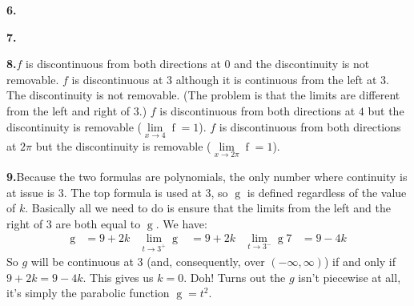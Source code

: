 \documentclass[12pt,]{book}
\theoremstyle{plain}
\theoremstyle{definition}
\numberwithin{equation}{section}
\newcommand{\fe}[2]{\mathop{{#1}{\left(#2\right)}}}
\newcommand{\ointerval}[2]{\left(#1,#2\right)}
\begin{document}
\par\smallskip
\noindent\textbf{6.}
\par\smallskip
\noindent\textbf{7.}
\par\smallskip
\noindent\textbf{8.}\quad{}\(f\) is discontinuous from both directions at \(0\) and the discontinuity is not removable. \(f\) is discontinuous at \(3\) although it is continuous from the left at \(3\).  The discontinuity is not removable.  (The problem is that the limits are different from the left and right of \(3\).) \(f\) is discontinuous from both directions at \(4\) but the discontinuity is removable (\(\lim\limits_{x\to4}\fe{f}{x}=1\)). \(f\) is discontinuous from both directions at \(2\pi\) but the discontinuity is removable (\(\lim\limits_{x\to2\pi}\fe{f}{x}=1\)).%
\par\smallskip
\noindent\textbf{9.}\quad{}Because the two formulas are polynomials, the only number where continuity is at issue is \(3\).  The top formula is used at \(3\), so \(\fe{g}{3}\) is defined regardless of the value of \(k\).  Basically all we need to do is ensure that the limits from the left and the right of \(3\) are both equal to \(\fe{g}{3}\).  We have: \begin{align*}
\fe{g}{3}&=9+2k&\lim_{t\to3^{+}}\fe{g}{t}&=9+2k&\lim_{t\to3^{-}}\fe{g}{t}7&=9-4k
\end{align*}So \(g\) will be continuous at \(3\) (and, consequently, over \(\ointerval{-\infty}{\infty}\)) if and only if \(9+2k=9-4k\).  This gives us \(k=0\).  Doh!  Turns out the \(g\) isn't piecewise at all, it's simply the parabolic function \(\fe{g}{t}=t^2\).%
\end{document}
